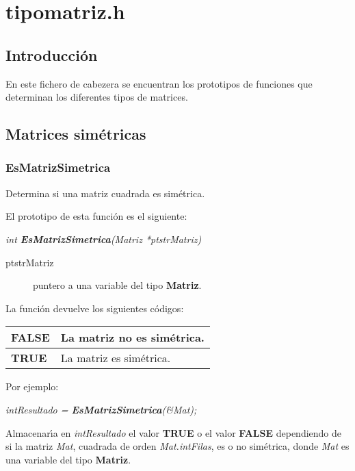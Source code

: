%
%

\chapter{tipomatriz.h}

\section{Introducci\'on}
En este fichero de cabezera se encuentran los prototipos de funciones que
determinan los diferentes tipos de matrices.

\section{Matrices sim\'etricas}

\subsection{EsMatrizSimetrica}
Determina si una matriz cuadrada es sim\'etrica.\newline

El prototipo de esta funci\'on es el siguiente:

\begin{center}
\emph{int \textbf{EsMatrizSimetrica}(Matriz *ptstrMatriz)}
\end{center}

\begin{description}
\item[ptstrMatriz] puntero a una variable del tipo \textbf{Matriz}. 
\end{description}

La funci\'on devuelve los siguientes c\'odigos:

\begin{center}
\begin{tabular}{|l|l|}
\hline
\textbf{FALSE} & La matriz no es sim\'etrica. \\
\hline
\textbf{TRUE} & La matriz es sim\'etrica. \\
\hline
\end{tabular}
\end{center}

Por ejemplo:

\begin{center}
\emph{intResultado = \textbf{EsMatrizSimetrica}(\&Mat);}
\end{center}

Almacenar\'{\i}a en \emph{intResultado} el valor \textbf{TRUE} o el valor
\textbf{FALSE} dependiendo de si la matriz \emph{Mat}, cuadrada de orden 
\emph{Mat.intFilas}, es o no sim\'etrica, donde \emph{Mat} es una variable del
tipo \textbf{Matriz}.

